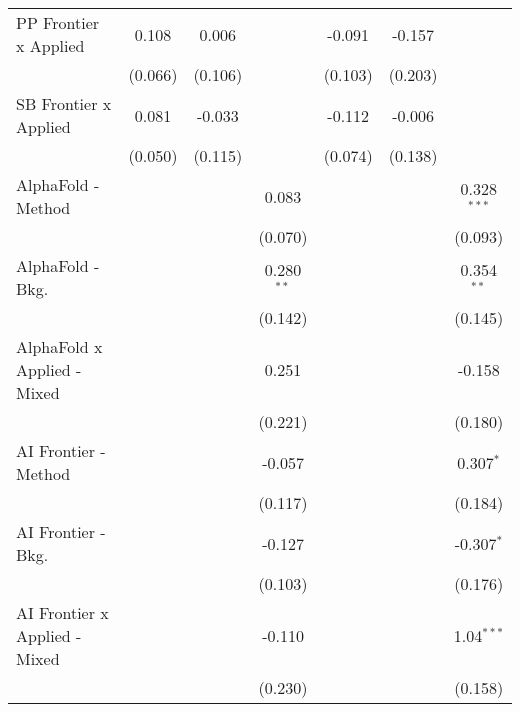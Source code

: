 \begin{tabular}{lcccccc}
   PP Frontier x Applied          & 0.108         & 0.006        &                & -0.091        & -0.157       &   \\   
                                  & (0.066)       & (0.106)      &                & (0.103)       & (0.203)      &   \\   
   SB Frontier x Applied          & 0.081         & -0.033       &                & -0.112        & -0.006       &   \\   
                                  & (0.050)       & (0.115)      &                & (0.074)       & (0.138)      &   \\   
   AlphaFold - Method             &               &              & 0.083          &               &              & 0.328$^{***}$\\   
                                  &               &              & (0.070)        &               &              & (0.093)\\   
   AlphaFold - Bkg.               &               &              & 0.280$^{**}$   &               &              & 0.354$^{**}$\\   
                                  &               &              & (0.142)        &               &              & (0.145)\\   
   AlphaFold x Applied - Mixed    &               &              & 0.251          &               &              & -0.158\\   
                                  &               &              & (0.221)        &               &              & (0.180)\\   
   AI Frontier - Method           &               &              & -0.057         &               &              & 0.307$^{*}$\\   
                                  &               &              & (0.117)        &               &              & (0.184)\\   
   AI Frontier - Bkg.             &               &              & -0.127         &               &              & -0.307$^{*}$\\   
                                  &               &              & (0.103)        &               &              & (0.176)\\   
   AI Frontier x Applied - Mixed  &               &              & -0.110         &               &              & 1.04$^{***}$\\   
                                  &               &              & (0.230)        &               &              & (0.158)\\   

\end{tabular}
